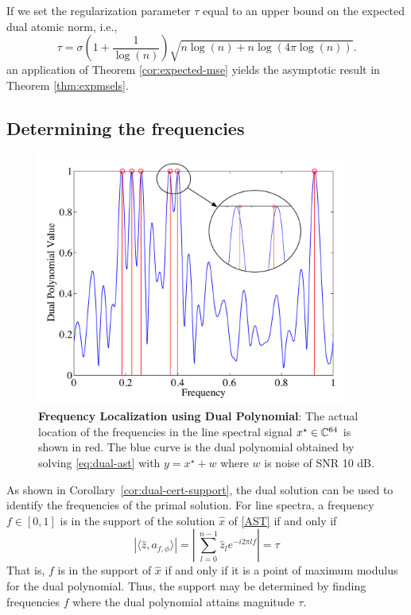 If we set the regularization parameter $\tau$ equal to an
upper bound on the expected dual atomic norm, i.e.,
\begin{equation}
\label{eq:tau}
\tau = \sigma\left(1  +  \frac{1}{\log(n)}\right)\sqrt{n \log(n) + n\log(4\pi\log(n))}.
\end{equation}
an application of Theorem \ref{cor:expected-mse} yields the asymptotic result
in Theorem \ref{thm:expmsels}.

\subsection{Determining the frequencies}
\label{sec:frequency-localize}
\begin{figure}[htp]
\centering
\includegraphics[width=4in]{figures/dual_poly_inset.pdf}
\caption{ \textbf{Frequency Localization using Dual Polynomial}: The
actual location of the frequencies in the line spectral signal $x^\star \in
\mathbb{C}^{64}$ is shown in red. The blue curve is the dual polynomial
obtained by solving \eqref{eq:dual-ast} with $y = x^\star + w$ where $w$ is noise of SNR 10 dB.}

\label{fig:dual_poly_localize}
\end{figure}

As shown in Corollary~\ref{cor:dual-cert-support}, the dual solution can be
used to identify the frequencies of the primal solution. For line spectra, a frequency
$f \in [0,1]$ is in the support of the solution $\hat{x}$ of \eqref{AST} if and
only if
\[
	 |\langle \hat{z}, a_{f,\phi} \rangle| =\left|\ \sum_{l=0}^{n-1} \hat{z}_l e^{-i 2\pi l f} \right| = \tau
\]
That is, $f$ is in the support of $\hat{x}$ if and only if it is a point of maximum modulus for the dual polynomial. Thus, the support
may be determined by finding frequencies $f$ where the dual polynomial attains magnitude $\tau$. 

